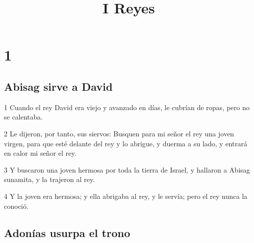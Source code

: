 

\title{I Reyes}

\chapter{1}

\section*{Abisag sirve a David}

\par 1 Cuando el rey David era viejo y avanzado en días, le cubrían de ropas, pero no se calentaba.
\par 2 Le dijeron, por tanto, sus siervos: Busquen para mi señor el rey una joven virgen, para que esté delante del rey y lo abrigue, y duerma a su lado, y entrará en calor mi señor el rey.
\par 3 Y buscaron una joven hermosa por toda la tierra de Israel, y hallaron a Abisag sunamita, y la trajeron al rey.
\par 4 Y la joven era hermosa; y ella abrigaba al rey, y le servía; pero el rey nunca la conoció.

\section*{Adonías usurpa el trono}

